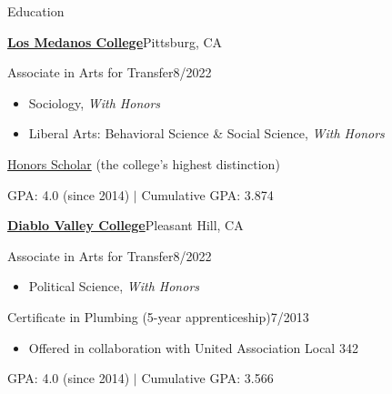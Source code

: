 \documentclass[12pt]{resume} %
\begin{document}
\begin{rSection}{Education}
\begin{itemize}[leftmargin=0em, itemsep=0pt]
\begin{itemize}[leftmargin=2em, itemsep=0pt]
\end{itemize}
\vspace{12pt}
\item[] \textbf{\href{https://www.losmedanos.edu/}{Los Medanos College}}\hfill{}Pittsburg, CA
\begin{itemize}[leftmargin=2em, itemsep=0pt]
    \item[] Associate in Arts for Transfer\hfill{}8/2022
    \begin{itemize}[leftmargin=2em, itemsep=0pt]
        \item[] Sociology, \textit{With Honors}
        \item[] Liberal Arts: Behavioral Science \& Social Science, \textit{With Honors}
    \end{itemize}
    \item[] \href{https://www.losmedanos.edu/honors/prog.aspx}{Honors Scholar} (the college’s highest distinction)
    {\item[] GPA: 4.0 (since 2014) $|$ Cumulative GPA: 3.874}
\end{itemize}
\vspace{12pt}
\item[] \textbf{\href{https://www.dvc.edu/}{Diablo Valley College}}\hfill{}Pleasant Hill, CA
\begin{itemize}[leftmargin=2em, itemsep=0pt]
    \item[] Associate in Arts for Transfer\hfill{}8/2022
    \begin{itemize}[leftmargin=2em, itemsep=0pt]
        \item[] Political Science, \textit{With Honors}
    \end{itemize}
    \item[] Certificate in Plumbing (5-year apprenticeship)\hfill{}7/2013
    \begin{itemize}[leftmargin=2em, itemsep=0pt]
        \item[] Offered in collaboration with United Association Local 342
    \end{itemize}
    {\item[] GPA: 4.0 (since 2014) $|$ Cumulative GPA: 3.566}
\end{itemize}
\end{itemize}

\end{rSection}
\end{document}
